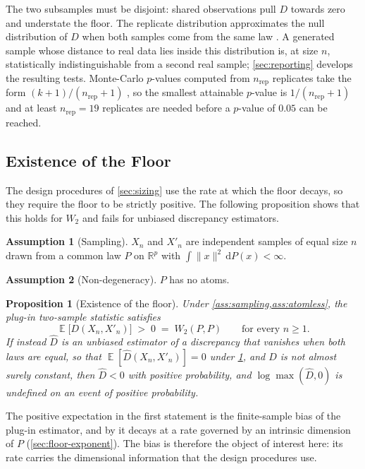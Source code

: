 \documentclass[twoside,11pt]{article}
\theoremstyle{plain}
\newtheorem{prop}{Proposition}
\theoremstyle{definition}
\newtheorem{assumption}{Assumption}
\theoremstyle{remark}
\newcommand{\Wtwo}{\ensuremath{W_2}}
\DeclareMathOperator{\E}{\mathbb{E}}
\newcommand{\R}{\ensuremath{\mathbb{R}}}
\begin{document}
The two subsamples must be disjoint: shared observations pull $D$ towards
zero and understate the floor. The replicate distribution approximates the
null distribution of $D$ when both samples come from the same law
\citep{ramdas2017}. A generated sample whose distance to real data lies
inside this distribution is, at size $n$, statistically indistinguishable
from a second real sample; \cref{sec:reporting} develops the resulting
tests. Monte-Carlo $p$-values computed from $n_{\mathrm{rep}}$ replicates
take the form $(k+1)/(n_{\mathrm{rep}}+1)$ \citep{hope1968,davison1997},
so the smallest attainable $p$-value is $1/(n_{\mathrm{rep}}+1)$ and at least
$n_{\mathrm{rep}} = 19$ replicates are needed before a $p$-value of $0.05$
can be reached.

\subsection{Existence of the Floor}\label{sec:floor-bias}

The design procedures of \cref{sec:sizing} use the rate at which the floor
decays, so they require the floor to be strictly positive. The following
proposition shows that this holds for $\Wtwo$ and fails for unbiased
discrepancy estimators.

\begin{assumption}[Sampling]\label{ass:sampling}
$X_n$ and $X'_n$ are independent samples of equal size $n$ drawn from a
common law $P$ on $\R^p$ with $\int \|x\|^2 \,\mathrm{d}P(x) < \infty$.
\end{assumption}

\begin{assumption}[Non-degeneracy]\label{ass:atomless}
$P$ has no atoms.
\end{assumption}

\begin{prop}[Existence of the floor]\label{prop:floor}
Under \cref{ass:sampling,ass:atomless}, the plug-in two-sample statistic
satisfies
\[
  \E\bigl[D(X_n, X'_n)\bigr] \;>\; 0 \;=\; \Wtwo(P, P)
  \qquad \text{for every } n \geq 1 .
\]
If instead $\hat{D}$ is an unbiased estimator of a discrepancy that
vanishes when both laws are equal, so that $\E[\hat{D}(X_n, X'_n)] = 0$
under \cref{ass:sampling}, and $\hat{D}$ is not almost surely constant,
then $\hat{D} < 0$ with positive probability, and
$\log \max(\hat D, 0)$ is undefined on an event of positive probability.
\end{prop}

The positive expectation in the first statement is the finite-sample bias
of the plug-in estimator, and by \citet{weedbach2019} it decays at a rate
governed by an intrinsic dimension of $P$ (\cref{sec:floor-exponent}). The
bias is therefore the object of interest here: its rate carries the
dimensional information that the design procedures use.
\end{document}
